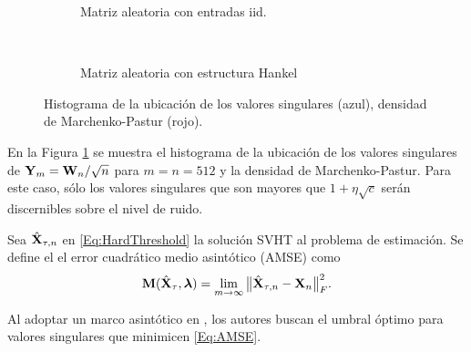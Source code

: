     \begin{figure}[t]
		\begin{subfigure}[b]{0.5\linewidth}
			\centering
			\resizebox{0.9\linewidth}{!}{}
			\caption{Matriz aleatoria con entradas iid.}
			\label{Fig:Histograma_SingularValues_iid}
		\end{subfigure}
		~
		\begin{subfigure}[b]{0.5\linewidth} 
			\centering
			\resizebox{0.9\linewidth}{!}{}
			\caption{Matriz aleatoria con estructura Hankel}
			\label{Fig:Histograma_SingularValues_Hankel}
		\end{subfigure}
		\caption{Histograma de la ubicación de los valores singulares (azul), densidad de Marchenko-Pastur (rojo).}
		\label{Fig:svd1}
	\end{figure}
    En la Figura \ref{Fig:Histograma_SingularValues_iid} se muestra el histograma de la ubicación de los valores singulares de $\mathbf{Y}_m = \mathbf{W}_n/\sqrt{n}$ para $m=n=512$ y la densidad de Marchenko-Pastur. Para este caso, sólo los valores singulares que son mayores que $1+\eta\sqrt{c}$ serán discernibles sobre el nivel de ruido.
		
	Sea $\hat{\mathbf{X}}_{\tau,n}$ en \eqref{Eq:HardThreshold} la solución SVHT al problema de estimación. Se define el el error cuadrático medio asintótico (AMSE) como
	\begin{equation}
		\mathbf{M}(\hat{\mathbf{X}}_{\tau}, \boldsymbol{\lambda}) = \lim\limits_{m\to\infty}\big\|\hat{\mathbf{X}}_{\tau,n} - \mathbf{X}_n \big\|_F^2.
		\label{Eq:AMSE}
	\end{equation}
				
	Al adoptar un marco asintótico en \cite{Gavish2014}, los autores buscan el umbral óptimo para valores singulares que minimicen \eqref{Eq:AMSE}.
			
